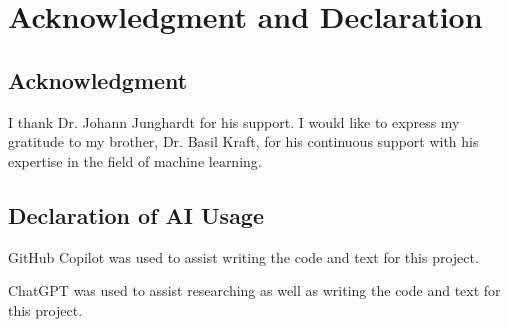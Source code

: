 


\section{Acknowledgment and Declaration}
\label{acknowledgment_declaration}

\subsection{Acknowledgment}%

I thank Dr. Johann Junghardt for his support.
I would like to express my gratitude to my brother, Dr. Basil Kraft, for his continuous
support with his expertise in the field of machine learning. 

\subsection{Declaration of AI Usage}%

GitHub Copilot was used to assist writing the code and text for this project.

ChatGPT was used to assist researching as well as writing the code and text for this project.

\newpage
{}

